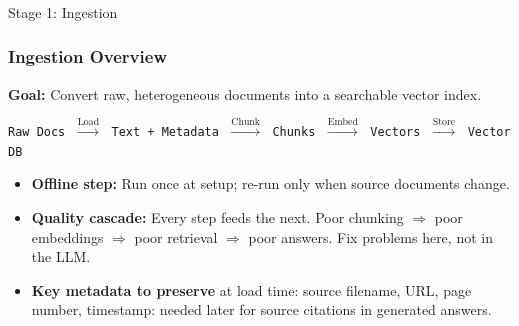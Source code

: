 \begin{frame}[fragile]\frametitle{}
\begin{center}
{\Large Stage 1: Ingestion}
\end{center}
\end{frame}

\begin{frame}[fragile]\frametitle{Ingestion Overview}

\textbf{Goal:} Convert raw, heterogeneous documents into a searchable vector index.

\vspace{0.3em}
\begin{center}
\small
\texttt{Raw Docs}
$\;\xrightarrow{\text{Load}}\;$
\texttt{Text + Metadata}
$\;\xrightarrow{\text{Chunk}}\;$
\texttt{Chunks}
$\;\xrightarrow{\text{Embed}}\;$
\texttt{Vectors}
$\;\xrightarrow{\text{Store}}\;$
\texttt{Vector DB}
\end{center}

\vspace{0.4em}
\begin{itemize}
  \item \textbf{Offline step:} Run once at setup; re-run only when source documents change.
  \item \textbf{Quality cascade:} Every step feeds the next. Poor chunking $\Rightarrow$ poor embeddings $\Rightarrow$ poor retrieval $\Rightarrow$ poor answers. Fix problems here, not in the LLM.
  \item \textbf{Key metadata to preserve} at load time: source filename, URL, page number, timestamp: needed later for source citations in generated answers.
\end{itemize}

\end{frame}

